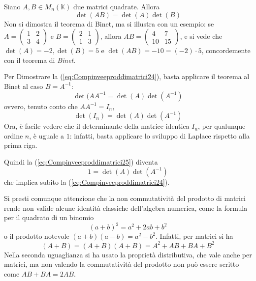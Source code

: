\begin{teo}
  \label{es:Compinveeproddimatrici6}
  Siano $A,B\in M_n(\mathds{K})$ due matrici quadrate. Allora
  \begin{equation*}
    \det(AB)=\det(A)\det(B)
  \end{equation*}
  Non si dimostra il teorema di Binet, ma si illustra con un esempio: se $A=
  \begin{pmatrix}
    1 & 2\\
    3 & 4
  \end{pmatrix}$ e $B=
  \begin{pmatrix}
    2 & 1\\
    1 & 3
  \end{pmatrix}$, allora $AB=
  \begin{pmatrix}
    4 & 7\\
    10 & 15
  \end{pmatrix}$, e si vede che $\det(A)=-2, \det(B)=5$ e $\det(AB)=-10=(-2)\cdot 5$, concordemente con
  il teorema di \textit{Binet}.
\end{teo}
Per Dimostrare la (\ref{eq:Compinveeproddimatrici24}), basta applicare il teorema al Binet al caso
$B=A^{-1}$:
\begin{equation*}
  \det(AA^{-1}=\det(A)\det(A^{-1})
\end{equation*}
ovvero, tenuto conto che $AA^{-1}=I_n$,
\begin{equation}
  \label{eq:Compinveeproddimatrici25}
  \det(I_n)=\det(A)\det(A^{-1})
\end{equation}
Ora, è facile vedere che il determinante della matrice identica $I_n$, per qualunque ordine $n$,
è uguale a $1$: infatti, basta applicare lo sviluppo di Laplace rispetto alla prima riga.

Quindi la (\ref{eq:Compinveeproddimatrici25}) diventa
\begin{equation*}
  1=\det(A)\det(A^{-1})
\end{equation*}
che implica subito la (\ref{eq:Compinveeproddimatrici24}).

Si presti comunque attenzione che la non commutatività del prodotto di matrici rende non valide
alcune identità classiche dell'algebra numerica, come la formula per il quadrato di un binomio
\begin{equation*}
  (a+b)^2=a^2+2ab+b^2
\end{equation*}
o il prodotto notevole $(a+b)(a-b)=a^2-b^2$. Infatti, per matrici si ha
\begin{equation*}
  (A+B)=(A+B)(A+B)=A^2+AB+BA+B^2
\end{equation*}
Nella seconda uguaglianza si ha usato la proprietà distributiva, che vale anche per matrici, ma
non valendo la commutatività del prodotto non può essere scritto come $AB+BA=2AB$.


